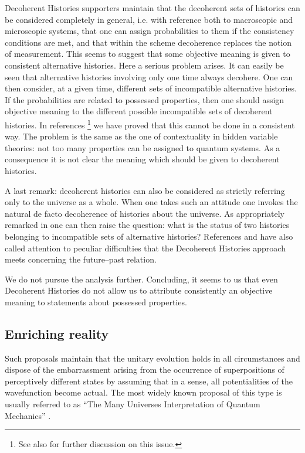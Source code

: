 \documentclass[12pt]{article}
\begin{document}
Decoherent Histories supporters  maintain that the decoherent sets
of histories can be considered completely in general, i.e. with
reference both to macroscopic and microscopic systems, that one
can assign probabilities to them if the consistency conditions are
met, and  that within the scheme decoherence replaces the notion
of measurement. This seems to suggest that some objective meaning
is given to consistent alternative histories. Here a serious
problem arises. It can easily be seen that alternative histories
involving only one time always decohere. One can then consider, at
a given time, different sets of incompatible alternative
histories. If the probabilities are related to possessed
properties, then one should assign objective meaning to the
different possible incompatible sets of decoherent histories. In
references \cite{bg2,bgp98}\footnote{See also \cite{gri5,bg2b} for
further discussion on this issue.} we have proved that this cannot
be done in a consistent way. The problem is the same as the one of
contextuality in hidden variable theories: not too many properties
can be assigned to quantum systems. As a consequence it is not
clear the meaning which should be given to decoherent histories.

A last remark: decoherent histories can also be considered as
strictly referring only to the universe as a whole. When one takes
such an attitude one invokes the natural de facto decoherence of
histories about the universe. As appropriately remarked in
\cite{rim2} one can then raise the question: what is the status of
two histories belonging to incompatible sets of alternative
histories? References \cite{rim2} and \cite{de3} have also called
attention to peculiar difficulties that the Decoherent Histories
approach meets concerning the future--past relation.

We do not pursue the analysis further. Concluding, it seems to us
that even Decoherent Histories  do not allow us  to attribute
consistently an objective meaning to statements about possessed
properties.


\subsection{Enriching reality} \label{sec36}

Such proposals \cite{ev1,dw1,dw2,de1,al7,al5} maintain that the
unitary evolution holds in all circumstances and dispose of the
embarrassment arising from the occurrence of superpositions of
perceptively different states by assuming that in a sense, all
potentialities of the wavefunction become actual. The most widely
known proposal of this type is usually referred to as ``The Many
Universes Interpretation of Quantum Mechanics''
\cite{de1,al7,al5}.
\end{document}
